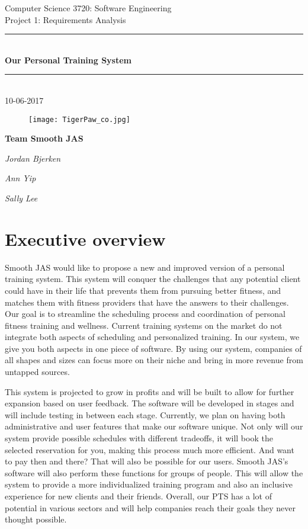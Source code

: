 \documentclass[12pt]{article}
\begin{document}
\begin{titlepage}
\newcommand{\HRule}{\rule{\linewidth}{0.5mm}} 

\center
\large Computer Science 3720: Software Engineering \\[0.2cm]

\normalsize Project 1:  Requirements Analysis \\[2cm]


\HRule \\[0.2cm]

\huge \textbf{Our Personal Training System}

\HRule \\[0.5cm]

\normalsize 10-06-2017
\vspace{5cm}


\begin{figure}[h]
\begin{center}
\texttt{[image: TigerPaw\_co.jpg]}
\end{center}
\end{figure}


\large \textbf{Team Smooth JAS}

\emph{Jordan Bjerken}

\emph{Ann Yip}

\emph{Sally Lee}

\end{titlepage}

\section{Executive overview}
Smooth JAS would like to propose a new and improved version of a personal training system. This system will conquer the challenges that any potential client could have in their life that prevents them from pursuing better fitness, and matches them with fitness providers that have the answers to their challenges. Our goal is to streamline the scheduling process and coordination of personal fitness training and wellness. Current training systems on the market do not integrate both aspects of scheduling and personalized training.  In our system, we give you both aspects in one piece of software. By using our system, companies of all shapes and sizes can focus more on their niche and bring in more revenue from untapped sources. 

	This system is projected to grow in profits and will be built to allow for further expansion based on user feedback. The software will be developed in stages and will include testing in between each stage. Currently, we plan on having both administrative and user features that make our software unique.  Not only will our system provide possible schedules with different tradeoffs, it will book the selected reservation for you, making this process much more efficient.  And want to pay then and there? That will also be possible for our users. Smooth JAS’s software will also perform these functions for groups of people. This will allow the system to provide a more individualized training program and also an inclusive experience for new clients and their friends. Overall, our PTS has a lot of potential in various sectors and will help companies reach their goals they never thought possible. 
\end{document}
